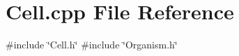 \section{Cell.\+cpp File Reference}
\label{Cell_8cpp}
{\ttfamily \#include \char`\"{}Cell.\+h\char`\"{}}\newline
{\ttfamily \#include \char`\"{}Organism.\+h\char`\"{}}\newline
